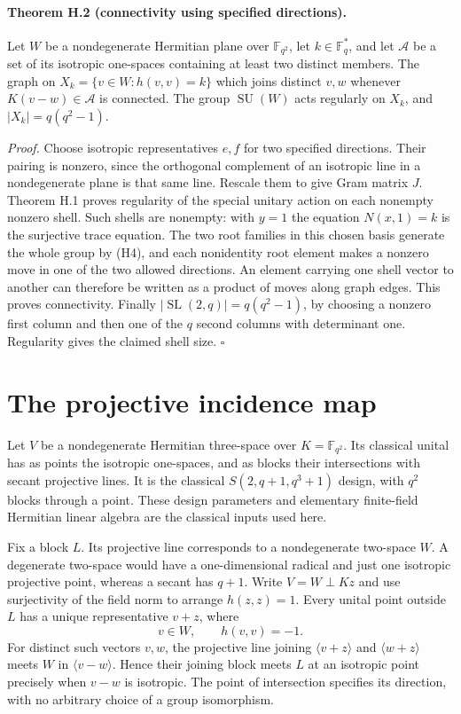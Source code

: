 \paragraph{Theorem H.2 (connectivity using specified directions).}
Let $W$ be a nondegenerate Hermitian plane over $\mathbb F_{q^2}$,
let $k\in\mathbb F_q^*$, and let $\mathcal A$ be a set of its
isotropic one-spaces containing at least two distinct members.
The graph on $X_k=\{v\in W:h(v,v)=k\}$ which joins distinct
$v,w$ whenever $K(v-w)\in\mathcal A$ is connected. The group
$\operatorname{SU}(W)$ acts regularly on $X_k$, and
$|X_k|=q(q^2-1)$.

\emph{Proof.}
Choose isotropic representatives $e,f$ for two specified directions.
Their pairing is nonzero, since the orthogonal complement of an
isotropic line in a nondegenerate plane is that same line. Rescale
them to give Gram matrix $J$. Theorem H.1 proves regularity of
the special unitary action on each nonempty nonzero shell. Such
shells are nonempty: with $y=1$ the equation $N(x,1)=k$ is the
surjective trace equation. The two root families in this chosen
basis generate the whole group by (H4), and each nonidentity
root element makes a nonzero move in one of the two allowed
directions. An element carrying one shell vector to another can
therefore be written as a product of moves along graph edges.
This proves connectivity. Finally $|\operatorname{SL}(2,q)|
=q(q^2-1)$, by choosing a nonzero first column and then one of
the $q$ second columns with determinant one. Regularity gives
the claimed shell size. \hfill$\square$

\section{The projective incidence map}

Let $V$ be a nondegenerate Hermitian three-space over
$K=\mathbb F_{q^2}$. Its classical unital has as points the
isotropic one-spaces, and as blocks their intersections with
secant projective lines. It is the classical
$S(2,q+1,q^3+1)$ design, with $q^2$ blocks through a point.
These design parameters and elementary finite-field Hermitian
linear algebra are the classical inputs used here.

Fix a block $L$. Its projective line corresponds to a nondegenerate
two-space $W$. A degenerate two-space would have a one-dimensional
radical and just one isotropic projective point, whereas a secant
has $q+1$. Write $V=W\perp Kz$ and use surjectivity of the field
norm to arrange $h(z,z)=1$. Every unital point outside $L$ has a
unique representative $v+z$, where
\[
                    v\in W,\qquad h(v,v)=-1.                \tag{H5}
\]
For distinct such vectors $v,w$, the projective line joining
$\langle v+z\rangle$ and $\langle w+z\rangle$ meets $W$ in
$\langle v-w\rangle$. Hence their joining block meets $L$ at
an isotropic point precisely when $v-w$ is isotropic. The point
of intersection specifies its direction, with no arbitrary
choice of a group isomorphism.


